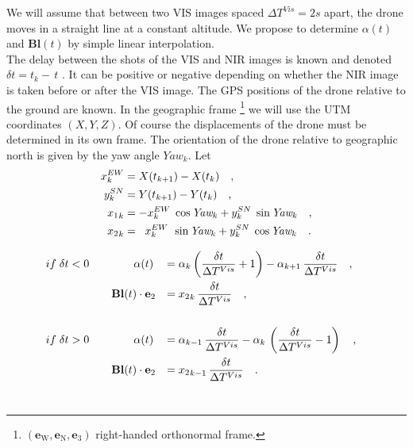 \documentclass[a4paper,11pt]{report}
\begin{document}
We will assume that between two VIS images spaced $\Delta T^{Vis} =2s$ apart, the drone moves in a straight line at a constant altitude.
We propose to determine $\alpha(t)$ and $\mathbf{Bl}(t)$ by simple linear interpolation.\\

The delay between the shots of the VIS and NIR images is known and denoted $\delta t= t_k -\,t$ .
It can be positive or negative depending on whether the NIR image is taken before or after the VIS image.
The GPS positions of the drone relative to the ground are known.
In the geographic frame
\footnote{$(\mathbf{e}_{\mathrm{W}}, \mathbf{e}_{\mathrm{N}}, \mathbf{e}_3)$ right-handed orthonormal frame.}
we will use the UTM coordinates $(X, Y, Z)$. Of course the displacements of the drone must be determined in its own frame. The orientation of the drone relative to geographic north is given by the yaw angle $\textit{Yaw}_k$. Let\\
\begin{equation}
	\label{Theoritical_Pitch_non_syncho_11}
	\begin{aligned}
		{x}^{EW}_k&=X(t_{k+1})-X(t_{k}) \quad,\\
		{y}^{SN}_k&=Y(t_{k+1})-Y(t_{k}) \quad,\\
		{x_1}_k&=-{x}^{EW}_k\; \cos \textit{Yaw}_k + {y}^{SN}_k\; \sin \textit{Yaw}_k \quad,\\
		{x_2}_k&=\;\;{x}^{EW}_k\:\: \sin \textit{Yaw}_k + {y}^{SN}_k\; \cos \textit{Yaw}_k  \quad.\\
	\end{aligned} \\
\end{equation}


\begin{equation}
	\label{Theoritical_Pitch_non_syncho_1}
	\begin{aligned}
		if \;\delta t <0 \qquad& \qquad\alpha(t)&=&\;\alpha_k \left(\frac{\delta t}{ \Delta T^{Vis} }+1\right) - \alpha_{k+1}\,\frac{\delta t}{ \Delta T^{Vis}} \quad,\\
		&\mathbf{Bl}(t) \cdot \mathbf{e}_2&=&\; {x_2}_k\,\frac{\delta t}{ \Delta T^{Vis}} \quad,&\\
		&&&\\
		if \;\delta t >0 \qquad &\qquad \alpha(t)&=&\;\alpha_{k-1} \,\frac{\delta t}{ \Delta T^{Vis}}- \alpha_k\, \left(\frac{\delta t}{ \Delta T^{Vis} }-1\right)  \quad,\\
		&\mathbf{Bl}(t) \cdot \mathbf{e}_2&=&\; {x_2}_{k-1}\,\frac{\delta t}{ \Delta T^{Vis}} \quad.&\\
	\end{aligned} \\
\end{equation}\\
\end{document}
